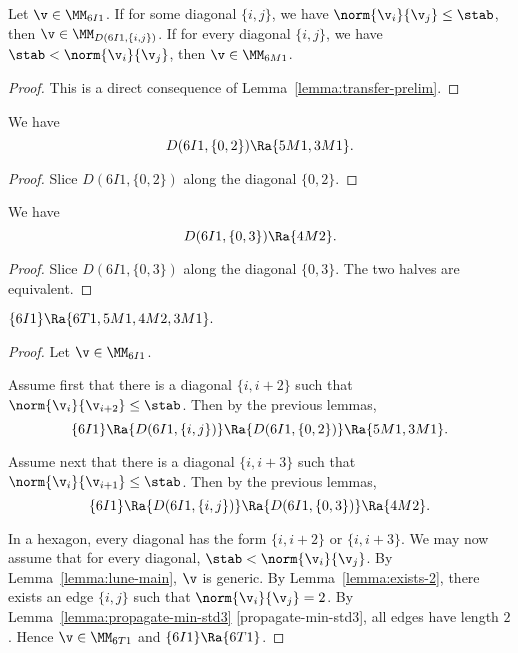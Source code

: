 \begin{lemma}[] Let $\v\in \MM_{6I1}$.  If for some diagonal $\{i,j\}$, we have $\norm{\v_i}{\v_j}\le \stab$,
then $\v\in \MM_{D(6I1,\{i,j\})}$.  If for every diagonal $\{i,j\}$, we have $\stab < \norm{\v_i}{\v_j}$, then
$\v \in \MM_{6M1}$.
\end{lemma}

\begin{proof} This is a direct consequence of Lemma~\ref{lemma:transfer-prelim}.
\end{proof}



\begin{lemma}\label{lemma:hex-slice}
We have
\[
D(6I1,\{0,2\}) \Ra \{5M1,3M1\}.
\]
\end{lemma}

\begin{proof}
Slice $D(6I1,\{0,2\})$ along the diagonal $\{0,2\}$.
\end{proof}

\begin{lemma}\label{lemma:hex-slice2}
We have
\[
D(6I1,\{0,3\}) \Ra \{4M2\}.
\]
\end{lemma}

\begin{proof}
Slice $D(6I1,\{0,3\})$ along the diagonal $\{0,3\}$. The two halves are equivalent.
\end{proof}

\begin{lemma}\label{lemma:hex-slice3}
$\{6I1\}\Ra \{6T1,5M1,4M2,3M1\}.$
\end{lemma}

\begin{proof}
Let $\v\in \MM_{6I1}$.  

Assume first that there is a diagonal $\{i,i+2\}$ such that $\norm{\v_i}{\v_{i+2}}\le \stab$.
Then by the previous lemmas,
\[
\{6I1\}\Ra \{D(6I1,\{i,j\})\} \Ra \{D(6I1,\{0,2\})\} \Ra \{5M1,3M1\}.
\]

Assume next
that there is a diagonal $\{i,i+3\}$ such that $\norm{\v_i}{\v_{i+1}}\le \stab$.
Then by the previous lemmas,
\[
\{6I1\}\Ra \{D(6I1,\{i,j\})\} \Ra \{D(6I1,\{0,3\})\} \Ra \{4M2\}.
\]

In a hexagon, every diagonal has the form $\{i,i+2\}$ or $\{i,i+3\}$.  We may now assume that
for every diagonal, $\stab < \norm{\v_i}{\v_j}$.  By Lemma~\ref{lemma:lune-main}, $\v$ is generic.
By Lemma~\ref{lemma:exists-2}, there exists an edge $\{i,j\}$ such that $\norm{\v_i}{\v_j} = 2$.
By Lemma~\ref{lemma:propagate-min-std3} [propagate-min-std3], all edges have length $2$.
Hence $\v\in \MM_{6T1}$ and $\{6I1\}\Ra \{6T1\}$.
\end{proof}

